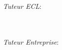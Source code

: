 \begin{titlepage}
    \begin{minipage}{0.4\textwidth}
        \begin{flushleft}
            \emph{Tuteur ECL}:\\
            {\scshape \schoolTutorLastName{}}~\textit{\schoolTutorFirstName{}}\\
            \href{mailto:\schoolTutorEmail}{\schoolTutorEmail}\\
        \end{flushleft}
    \end{minipage}
    \hfill
    \begin{minipage}{0.4\textwidth}
        \begin{flushright}
            \emph{Tuteur Entreprise}: \\
            {\scshape \companyTutorLastName{}}~\textit{\companyTutorFirstName{}}\\
            \href{mailto:\companyTutorEmail}{\companyTutorEmail}\\
        \end{flushright}
    \end{minipage}\\[1.0\baselineskip]
\end{titlepage}
\hypersetup{pageanchor=true}
\restoregeometry{}

